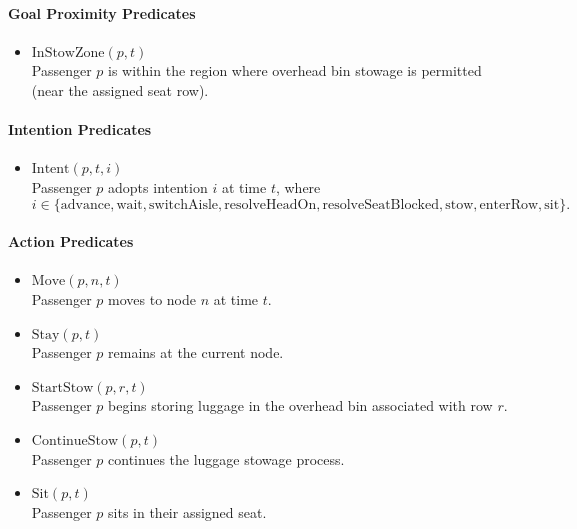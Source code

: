 \documentclass[11pt,a4paper]{article}
\begin{document}
\paragraph{Goal Proximity Predicates}

\begin{itemize}

\item $\text{InStowZone}(p,t)$\\
Passenger $p$ is within the region where overhead bin stowage is permitted (near the assigned seat row).

\end{itemize}

\paragraph{Intention Predicates}

\begin{itemize}

\item $\text{Intent}(p,t,i)$\\
Passenger $p$ adopts intention $i$ at time $t$, where
\[
i \in \{\text{advance}, \text{wait}, \text{switchAisle}, \text{resolveHeadOn}, \text{resolveSeatBlocked}, \text{stow}, \text{enterRow}, \text{sit}\}.
\]

\end{itemize}

\paragraph{Action Predicates}

\begin{itemize}

\item $\text{Move}(p,n,t)$\\
Passenger $p$ moves to node $n$ at time $t$.

\item $\text{Stay}(p,t)$\\
Passenger $p$ remains at the current node.

\item $\text{StartStow}(p,r,t)$\\
Passenger $p$ begins storing luggage in the overhead bin associated with row $r$.

\item $\text{ContinueStow}(p,t)$\\
Passenger $p$ continues the luggage stowage process.

\item $\text{Sit}(p,t)$\\
Passenger $p$ sits in their assigned seat.

\end{itemize}
\end{document}
